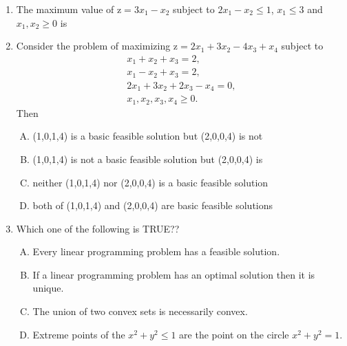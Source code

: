 \documentclass[journal,12pt,twocolumn]{IEEEtran}
\begin{document}
\begin{enumerate}
\item The maximum value of $\text{z} \! = \! 3x_1 \! - \! x_2$ subject to $2x_1 \! - \! x_2 \! \leqslant \! 1$, $x_1 \! \leqslant \! 3$ and $x_1, \! x_2 \! \geqslant \! 0$ is
\begin{enumerate}[(A)]
\end{enumerate}

\item Consider the problem of maximizing $\text{z} \! = \!2x_1 \! + \! 3x_2 \! - \! 4x_3 \! + \! x_4$ subject to 
\begin{align*}
x_1 \! + \! x_2 \! + \! x_3 \! = \! 2, \\
x_1 \! - \! x_2 \! + \! x_3 \! = \! 2, \\
2x_1 \! + \! 3x_2 \! + 2x_3 \! - \! x_4 \! = \! 0, \\
x_1, \! x_2, \! x_3, \! x_4 \! \geqslant \! 0. 
\end{align*}
\medskip
Then 
\begin{enumerate}[(A)]
\setlength\itemsep{1em}
\item (1,0,1,4) is a basic feasible solution but (2,0,0,4) is not
\item (1,0,1,4) is not a basic feasible solution but (2,0,0,4) is
\item neither (1,0,1,4) nor (2,0,0,4) is a basic feasible solution
\item both of (1,0,1,4) and (2,0,0,4) are basic feasible solutions
\end{enumerate}

\item Which one of the following is TRUE??
\begin{enumerate}[(A)]
\setlength\itemsep{1em} 
\item Every linear programming problem has a feasible solution.
\item If a linear programming problem has an optimal solution then it is unique.
\item The union of two convex sets is necessarily convex.
\item Extreme points of the $x^2 \! + \! y^2 \! \leqslant \! 1$ are the point on the circle $x^2 \! + \! y^2 \! = \! 1$.
\end{enumerate}


\end{enumerate}
\end{document}
